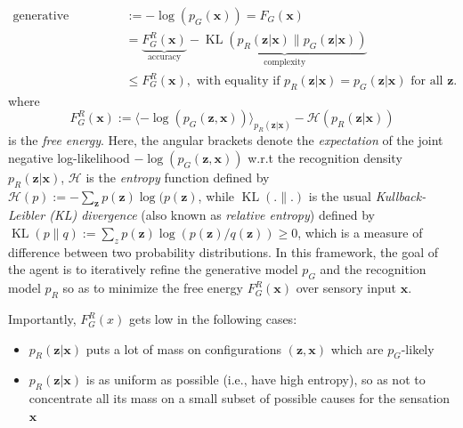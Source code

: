 \documentclass[10pt,letterpaper]{article}
\def\z{\mathbf{z}}
\def\x{\mathbf{x}}
\begin{document}
\begin{equation}
  \begin{split}
    \text{generative surprise } &:= -\log(p_G(\x)) = F_G(\x) \\
    &=\underbrace{F^R_G(\x)}_{\text{accuracy}} - \underbrace{\operatorname{{KL}}(p_R(\z|\x) \| p_G(\z|\x))}_{\text{complexity}} \\
    &\le F^R_G(\x),
    \text{ with equality if }p_R(\z|\x) = p_G(\z|\x)\text{ for all } \z.
  \end{split}
\end{equation}
where
\begin{equation}
  F_G^R(\x) := \langle -\log(p_G(\z, \x))\rangle_{p_R(\z|\x)} - \mathcal H(p_R(\z|\x))
\end{equation}
is the \textit{free energy}.
Here, the angular brackets denote the \textit{expectation} of the joint negative log-likelihood $-\log(p_G(\z, \x))$ w.r.t the recognition density $p_R(\z|\x)$, $\mathcal H$ is the \textit{entropy} function defined by $\mathcal H(p) := -\sum_{\z}p(\z)\log(p(\z)$, while $\operatorname{KL}(.\|.)$ is the usual \textit{Kullback-Leibler (KL) divergence} (also known as \textit{relative entropy}) defined by $\operatorname{KL}(p\|q) := \sum_{z}p(\z)\log(p(\z)/q(\z)) \ge 0$,
which is a measure of difference between two probability distributions. In this framework, the goal of the agent is to iteratively refine the generative model $p_G$ and the recognition model $p_R$ so as to minimize the free energy $F_G^R(\x)$ over sensory input $\x$.

Importantly, $F^R_G(x)$ gets low in the following cases:
\begin{itemize}
\item  $p_R(\z|\x)$ puts a lot of mass on configurations $(\z,\x)$ which are $p_G$-likely
\item $p_R(\z|\x)$ is as uniform as possible (i.e., have high entropy), so as not to concentrate
  all its mass on a small subset of possible causes for the sensation $\x$
  \end{itemize}
\end{document}
